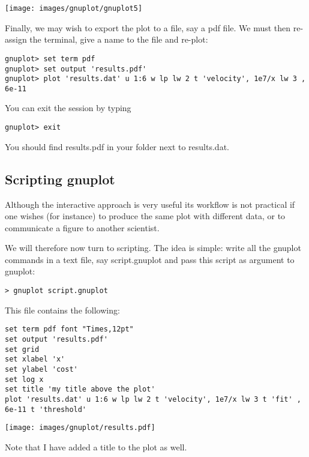 \begin{center}
\texttt{[image: images/gnuplot/gnuplot5]}
\end{center}
Finally, we may wish to export the plot to a file, say a pdf file. We must then 
re-assign the terminal, give a name to the file and re-plot:
\begin{mdframed}[backgroundcolor=gray!10]
\begin{verbatim}
gnuplot> set term pdf
gnuplot> set output 'results.pdf'
gnuplot> plot 'results.dat' u 1:6 w lp lw 2 t 'velocity', 1e7/x lw 3 , 6e-11 
\end{verbatim}
\end{mdframed}
You can exit the session by typing
\begin{mdframed}[backgroundcolor=gray!10]
\begin{verbatim}
gnuplot> exit 
\end{verbatim}
\end{mdframed}
You should find {\filenamefont results.pdf} in your folder next to {\filenamefont results.dat}.

\subsection*{Scripting gnuplot}

Although the interactive approach is very useful its workflow 
is not practical if one wishes (for instance) to produce the same plot 
with different data, or to communicate a figure to another scientist. 

We will therefore now turn to scripting. The idea is simple: 
write all the gnuplot commands in a text file, say {\filenamefont script.gnuplot} 
and pass this script as argument to gnuplot:
\begin{mdframed}[backgroundcolor=gray!10]
\begin{verbatim}
> gnuplot script.gnuplot 
\end{verbatim}
\end{mdframed}
This file contains the following:
\begin{verbatim}
set term pdf font "Times,12pt"
set output 'results.pdf'
set grid
set xlabel 'x'
set ylabel 'cost'
set log x
set title 'my title above the plot'
plot 'results.dat' u 1:6 w lp lw 2 t 'velocity', 1e7/x lw 3 t 'fit' , 6e-11 t 'threshold'
\end{verbatim}

\begin{center}
\texttt{[image: images/gnuplot/results.pdf]}
\end{center}
Note that I have added a title to the plot as well. 



